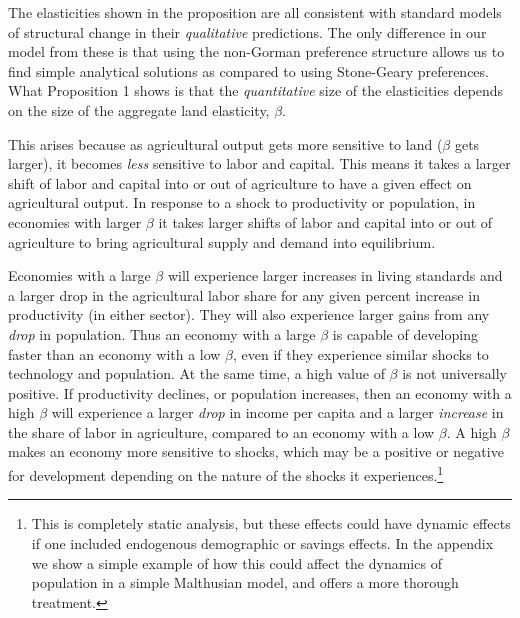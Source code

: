 \documentclass[11pt]{article}
\begin{document}
\vspace{.3cm} The elasticities shown in the proposition are all consistent with standard models of structural change \citep{kp2001,Gollin:2007oq,Restuccia:2008hc,Gollin:2010ys,vollrath2011,Alvarez-Cuadrado:2011nx,hrv2014,duarte2010role} in their \textit{qualitative} predictions. The only difference in our model from these is that using the non-Gorman preference structure allows us to find simple analytical solutions as compared to using Stone-Geary preferences. What Proposition 1 shows is that the \textit{quantitative} size of the elasticities depends on the size of the aggregate land elasticity, $\beta$. 

This arises because as agricultural output gets more sensitive to land ($\beta$ gets larger), it becomes \textit{less} sensitive to labor and capital. This means it takes a larger shift of labor and capital into or out of agriculture to have a given effect on agricultural output. In response to a shock to productivity or population, in economies with larger $\beta$ it takes larger shifts of labor and capital into or out of agriculture to bring agricultural supply and demand into equilibrium. 

Economies with a large $\beta$ will experience larger increases in living standards and a larger drop in the agricultural labor share for any given percent increase in productivity (in either sector). They will also experience larger gains from any \textit{drop} in population. Thus an economy with a large $\beta$ is capable of developing faster than an economy with a low $\beta$, even if they experience similar shocks to technology and population. At the same time, a high value of $\beta$ is not universally positive. If productivity declines, or population increases, then an economy with a high $\beta$ will experience a larger \textit{drop} in income per capita and a larger \textit{increase} in the share of labor in agriculture, compared to an economy with a low $\beta$. A high $\beta$ makes an economy more sensitive to shocks, which may be a positive or negative for development depending on the nature of the shocks it experiences.\footnote{This is completely static analysis, but these effects could have dynamic effects if one included endogenous demographic or savings effects. In the appendix we show a simple example of how this could affect the dynamics of population in a simple Malthusian model, and \citet{vollrath2011} offers a more thorough treatment.}
\end{document}
